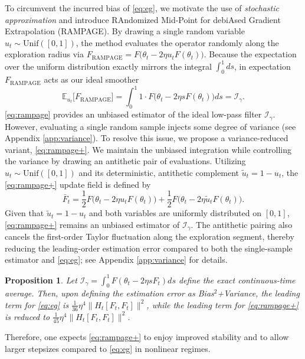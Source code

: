 \documentclass[letter,11pt]{article}
\newtheorem{proposition}{Proposition}[]
\begin{document}

To circumvent the incurred bias of \eqref{eq:eg}, we motivate the use of \emph{stochastic approximation} and introduce RAndomized Mid-Point for debiAsed Gradient Extrapolation (RAMPAGE). By drawing a single random variable $u_t \sim \mathrm{Unif}([0, 1])$, the method evaluates the operator randomly along the exploration radius via $F_{\text{RAMPAGE}} = F\big(\theta_t - 2\eta u_t F(\theta_t)\big).$
Because the expectation over the uniform distribution exactly mirrors the integral $\int_0^1 ds$, in expectation $F_{\text{RAMPAGE}}$ acts as our ideal smoother
\begin{equation} \label{eq:intro_rampage_unbiased}
\mathbb{E}_{u_t} \big[ F_{\text{RAMPAGE}} \big] = \int_0^1 1 \cdot F\big(\theta_t - 2\eta s F(\theta_t)\big) ds = \mathcal{I}_{\gamma}.
\end{equation}
\eqref{eq:rampage} provides an unbiased estimator of the ideal low-pass filter $\mathcal{I}_{\gamma}$. However, evaluating a single random sample injects some degree of variance (see Appendix \ref{app:variance}).
To resolve this issue, we propose a variance-reduced variant, \eqref{eq:rampage+}. We maintain the unbiased integration while controlling the variance by drawing an antithetic pair of evaluations. Utilizing $u_t \sim \mathrm{Unif}([0,1])$ and its deterministic, antithetic complement $\tilde{u}_t = 1 - u_t$, the \eqref{eq:rampage+} update field is defined by
\begin{equation} \label{eq:intro_rampage_plus_update}
\bar{F}_t = \frac{1}{2} F\big(\theta_t - 2\eta u_t F(\theta_t)\big) + \frac{1}{2} F\big(\theta_t - 2\eta \tilde{u}_t F(\theta_t)\big).
\end{equation}
Given that $\tilde{u}_t = 1-u_t$ and both variables are uniformly distributed on $[0,1]$, \eqref{eq:rampage+} remains an unbiased estimator of $\mathcal{I}_{\gamma}$. The antithetic pairing also cancels the first-order Taylor fluctuation along the exploration segment, thereby reducing the leading-order estimation error compared to both the single-sample estimator and \eqref{eq:eg}; see Appendix \ref{app:variance} for details.

\begin{proposition} \label{prop:estimation_error1}
Let $\mathcal{I}_{\gamma} = \int_0^1 F(\theta_t - 2\eta s F_t) ds$ define the exact continuous-time average. Then, upon defining the estimation error as Bias$^2$+Variance, the leading term for \eqref{eq:eg} is $\frac{1}{36}\eta^4 \|H_t[F_t, F_t]\|^2$, while the leading term for \eqref{eq:rampage+} is reduced to $\frac{1}{45}\eta^4 \|H_t[F_t, F_t]\|^2$.
\end{proposition}
Therefore, one expects \eqref{eq:rampage+} to enjoy improved stability and to allow larger stepsizes compared to \eqref{eq:eg} in nonlinear regimes. 
\end{document}
